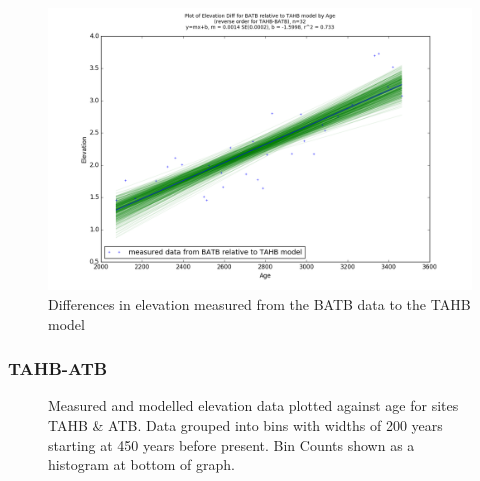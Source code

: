 \begin{figure}[H]
	\includegraphics[width=0.9\linewidth]{data/bothNonZero/withinSeventyFivePercent/gias/theGIA_BATB_relative_to_TAHB.png}
	\caption{Differences in elevation measured from the BATB data to the TAHB model}
	\label{fig:gias_BATBxTAHB}
\end{figure}
\newpage






\subsubsection{TAHB-ATB}

\begin{figure}[H]
	\caption{Measured and modelled elevation data plotted against age for sites TAHB \& ATB. Data grouped into bins with widths of 200 years starting at 450 years before present. Bin Counts shown as a histogram at bottom of graph.}	
	\label{fig:data_TAHBxATB}
\end{figure}

